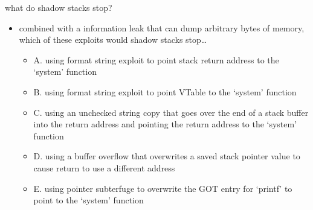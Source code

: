 \begin{frame}{what do shadow stacks stop?}
    \begin{itemize}
    \item combined with a information leak that can dump arbitrary bytes of memory, \\
       which of these exploits would shadow stacks stop\ldots
    \begin{itemize}
    \item A. using format string exploit to point stack return address to the `system' function
    \item B. using format string exploit to point VTable to the `system' function
    \item C. using an unchecked string copy that goes over the end of a stack buffer into the return address and pointing the return address to the `system' function
    \item D. using a buffer overflow that overwrites a saved stack pointer value to cause return to use a different address
    \item E. using pointer subterfuge to overwrite the GOT entry for `printf' to point to the `system' function
    \end{itemize}
    \end{itemize}
\end{frame}
